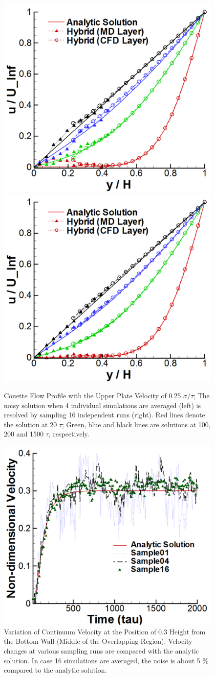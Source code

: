 \documentclass[preprint,12pt]{elsarticle}
\begin{document}
\begin{figure}
\centering
\includegraphics[width=0.6\linewidth]{Couette_025_Samp4.pdf}
\hskip 1cm
\includegraphics[width=0.6\linewidth]{Couette_025_Samp16.pdf}
\vskip-0.2cm
\caption{\small Couette Flow Profile with the Upper Plate Velocity of 0.25 $\sigma/\tau$; The noisy solution when 4 individual simulations are averaged (left) is resolved by sampling 16 independent runs (right). Red lines denote the solution at 20 $\tau$; Green, blue and black lines are solutions at 100, 200 and 1500 $\tau$, respectively.}
\label{multiple_couette}
\end{figure}

\begin{figure}
\centering
\includegraphics[width=0.6\linewidth]{Couette_025_Temporal_Multiset.pdf}
\vskip-0.2cm
\caption{\small Variation of Continuum Velocity at the Position of 0.3 Height from the Bottom Wall (Middle of the Overlapping Region); Velocity changes at various sampling runs are compared with the analytic solution. In case 16 simulations are averaged, the noise is about 5 $\%$ compared to the analytic solution.}
\label{multiple_couette_temporal}
\end{figure}
\end{document}
